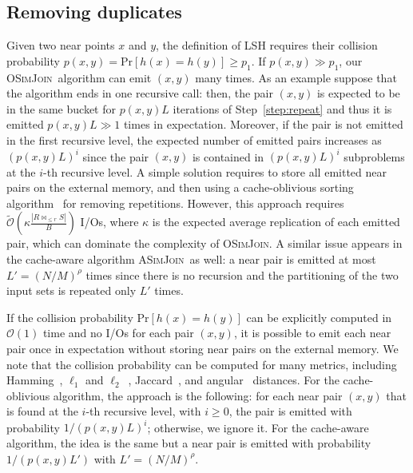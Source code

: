 \documentclass{llncs}
\newcommand{\Osymbol}{{\mathcal O}}
\newcommand{\BO}[1]{\Osymbol\left(#1\right)}
\newcommand{\TO}[1]{\tilde{\Osymbol}\left(#1\right)}
\renewcommand{\Pr}[1]{\text{Pr}\left[#1\right]}
\newcommand{\SimJoin}{\textsc{OSimJoin}}
\newcommand{\ASimJoin}{\textsc{ASimJoin}}
\begin{document}
\subsection{Removing duplicates}\label{sec:remove-duplicates}

Given two near points $x$ and $y$, the definition of LSH requires their collision probability $p(x,y)=\Pr{h(x)=h(y)} \geq p_1$.
If $p(x,y) \gg p_1$, our \SimJoin\ algorithm can emit $(x,y)$ many times. 
As an example suppose that the algorithm ends in one recursive call: then, the pair $(x,y)$ is expected to be in the same bucket for $p(x,y) L$ iterations of Step~\ref{step:repeat} and thus it is emitted $p(x,y) L \gg 1$ times in expectation. 
Moreover, if the pair is not emitted in the first recursive level, the expected number of emitted pairs increases as $(p(x,y) L)^i$ since the pair $(x,y)$ is contained in $(p(x,y)L)^i$ subproblems at the $i$-th recursive level.
A simple solution requires to store all emitted near pairs on the external memory, and then using a cache-oblivious sorting algorithm~\cite{frigo1999cache} for removing repetitions. 
However, this approach requires $\TO{\kappa \frac{|R \bowtie_{\leq r} S|}{B}}$ I/Os, where $\kappa$ is the expected average replication of each emitted pair, which can dominate the complexity of \SimJoin.
A similar issue appears in the cache-aware algorithm \ASimJoin\ as well: a near pair is emitted at most $L'=(N/M)^\rho$ times since there is no recursion and the  partitioning of the two input sets is repeated only $L'$ times.

If the collision probability $\Pr{h(x)=h(y)}$ can be explicitly computed in $\BO{1}$ time and no I/Os for each pair $(x,y)$, it is possible to emit each near pair once in expectation without storing near pairs on the external memory. 
We note that the collision probability can be computed for many metrics, including Hamming~\cite{Indyk_STOC98}, $\ell_1$ and $\ell_2$~\cite{Datar_SOCG04},
Jaccard~\cite{Broder_NETWORK97}, and angular~\cite{Charikar_STOC02} distances. 
For the cache-oblivious algorithm, the approach is the following: for each near pair $(x,y)$ that is found at the $i$-th recursive level, with
$i\geq 0$, the pair is emitted with probability $1/(p(x,y)L)^i$; otherwise, we ignore it.
For the cache-aware algorithm, the idea is the same but a near pair is emitted with probability $1/(p(x,y)L')$ with $L' = (N/M)^{\rho}$. 
\end{document}
